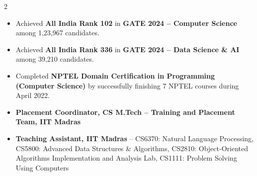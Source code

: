 \documentclass[10pt,a4paper,withhyper]{altacv}
\newcommand{\itemspace}{\vspace{-0.3cm}}
\begin{document}
\begin{paracol}{2}
\vspace{-0.2cm}
\begin{itemize}[noitemsep]
    \item Achieved \textbf{All India Rank 102} in \textbf{GATE 2024 – Computer Science} among 1,23,967 candidates.
    \item Achieved \textbf{All India Rank 336} in \textbf{GATE 2024 – Data Science \& AI} among 39,210 candidates.
    \item Completed \textbf{NPTEL Domain Certification in Programming (Computer Science)} by successfully finishing 7 NPTEL courses during April 2022.
\end{itemize}
\itemspace


\vspace{-0.2cm}
\begin{itemize}[noitemsep]
    \item \textbf{Placement Coordinator, CS M.Tech – Training and Placement Team, IIT Madras}
    \item \textbf{Teaching Assistant, IIT Madras} – CS6370: Natural Language Processing, CS5800: Advanced Data Structures \& Algorithms, CS2810: Object-Oriented Algorithms Implementation and Analysis Lab, CS1111: Problem Solving Using Computers
\end{itemize}




\end{paracol}
\end{document}
